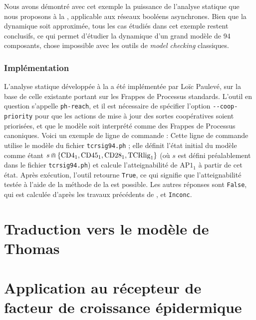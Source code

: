 \myskip

Nous avons démontré avec cet exemple la puissance de l'analyse statique que nous proposons
à la , applicable aux réseaux booléens asynchrones.
Bien que la dynamique soit approximée, tous les cas étudiés dans cet exemple restent conclusifs,
ce qui permet d'étudier la dynamique d'un grand modèle de 94 composants,
chose impossible avec les outils de \textit{model checking} classiques.

\subsubsection*{Implémentation}

L'analyse statique développée à la 
a été implémentée par Loïc Paulevé, sur la base de celle existante
portant sur les Frappes de Processus standards.
L'outil en question s'appelle \texttt{ph-reach}, et il est nécessaire de spécifier l'option
\texttt{-{}-coop-priority}
pour que les actions de mise à jour des sortes coopératives soient priorisées,
et que le modèle soit interprété comme des Frappes de Processus canoniques.
Voici un exemple de ligne de commande :
Cette ligne de commande utilise le modèle du fichier \texttt{tcrsig94.ph} ;
elle définit l'état initial du modèle comme étant
$s \Cap \{ \text{CD4}_1, \text{CD45}_1, \text{CD28}_1, \text{TCRlig}_1 \}$
(où $s$ est défini préalablement dans le fichier \texttt{tcrsig94.ph})
et calcule l'atteignabilité de $\text{AP1}_1$ à partir de cet état.
Après exécution, l'outil retourne \texttt{True}, ce qui signifie que l'atteignabilité
testée à l'aide de la méthode de la  est possible.
Les autres réponses sont \texttt{False},
qui est calculée d'après les travaux précédents de ,
et \texttt{Inconc}.



\section{Traduction vers le modèle de Thomas}


\section{Application au récepteur de facteur de croissance épidermique}

